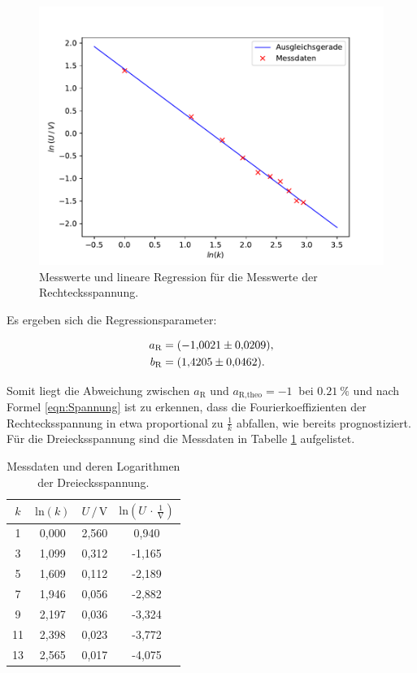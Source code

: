 \begin{figure}[H]
    \centering
    \includegraphics[scale=0.9]{content/plot2.pdf}
    \caption{Messwerte und lineare Regression für die Messwerte der Rechtecksspannung.}
    \label{fig:Recht}
\end{figure}

Es ergeben sich die Regressionsparameter:

\begin{align*}
    a_\text{R} &= \SI{-1.0021 \pm 0.0209}{}, \\
    b_\text{R} &= \SI{1.4205 \pm 0.0462}{}.
\end{align*}

Somit liegt die Abweichung zwischen $a_\text{R}$ und $a_\text{R,theo} = \SI{-1}{}$ bei $\SI{0.21}{\percent}$ und
nach Formel \eqref{eqn:Spannung} ist zu erkennen, dass die Fourierkoeffizienten der Rechtecksspannung in etwa
proportional zu $\frac{1}{k}$ abfallen, wie bereits prognostiziert.
\\
\newpage
Für die Dreiecksspannung sind die Messdaten in Tabelle \ref{tab:Messdaten3} aufgelistet.


\begin{table}[H]
    \centering
    \caption{Messdaten und deren Logarithmen der Dreiecksspannung.}
    \label{tab:Messdaten3}
    \begin{tabular}{c c c c}
    \toprule
    $k$ & $\text{ln} (k)$ & $U \,/\, \si{\volt}$ & $\text{ln}(U \,\cdot\, \frac{1}{\si{\volt}})$ \\
    \midrule
     1 & 0,000 & 2,560 &  0,940 \\
     3 & 1,099 & 0,312 & -1,165 \\
     5 & 1,609 & 0,112 & -2,189 \\
     7 & 1,946 & 0,056 & -2,882 \\
     9 & 2,197 & 0,036 & -3,324 \\
    11 & 2,398 & 0,023 & -3,772 \\
    13 & 2,565 & 0,017 & -4,075 \\
    \bottomrule
    \end{tabular}
\end{table} 

